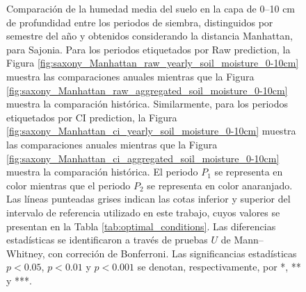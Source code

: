 \begin{figure}[htbp]
	\caption{
		Comparación de la humedad media del suelo en la capa de 0--10 cm de profundidad entre los periodos de siembra, distinguidos por semestre del año y obtenidos considerando la distancia Manhattan, para Sajonia. Para los periodos etiquetados por Raw prediction, la Figura \ref{fig:saxony_Manhattan_raw_yearly_soil_moisture_0-10cm} muestra las comparaciones anuales mientras que la Figura \ref{fig:saxony_Manhattan_raw_aggregated_soil_moisture_0-10cm} muestra la comparación histórica. Similarmente, para los periodos etiquetados por CI prediction, la Figura \ref{fig:saxony_Manhattan_ci_yearly_soil_moisture_0-10cm} muestra las comparaciones anuales mientras que la Figura \ref{fig:saxony_Manhattan_ci_aggregated_soil_moisture_0-10cm} muestra la comparación histórica. El periodo $P_1$ se representa en color mientras que el periodo $P_2$ se representa en color anaranjado. Las líneas punteadas grises indican las cotas inferior y superior del intervalo de referencia utilizado en este trabajo, cuyos valores se presentan en la Tabla \ref{tab:optimal_conditions}. Las diferencias estadísticas se identificaron a través de pruebas $U$ de Mann--Whitney, con correción de Bonferroni. Las significancias estadísticas $p<0.05$, $p<0.01$ y $p<0.001$ se denotan, respectivamente, por *, ** y ***.
	}
	\label{fig:saxony_Manhattan_soil_moisture_0-10cm}
	
	
\end{figure}



